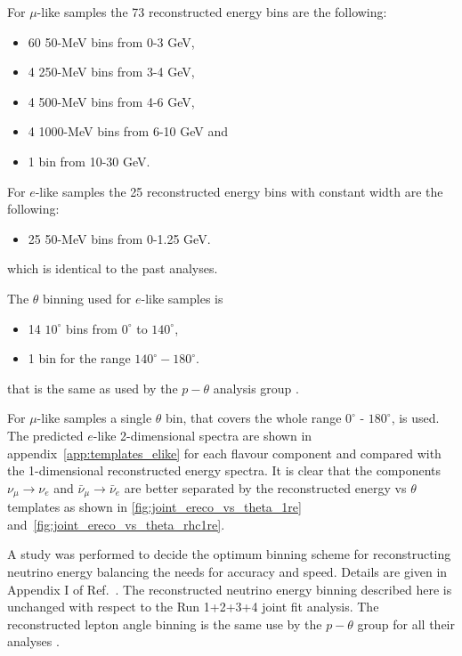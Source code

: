 For $\mu$-like samples the 73 reconstructed energy bins are the following:
\begin{itemize}
 \item   60 50-MeV bins from 0-3 GeV, 
 \item   4 250-MeV bins from 3-4 GeV, 
 \item   4 500-MeV bins from 4-6 GeV, 
 \item   4 1000-MeV bins from 6-10 GeV and
 \item   1 bin from 10-30 GeV.
\end{itemize}

For $e$-like samples the 25 reconstructed energy bins with constant width are the following:
\begin{itemize}
 \item   25 50-MeV bins from 0-1.25 GeV.
\end{itemize}
which is identical to the past analyses.

The $\theta$ binning used for $e$-like samples is
\begin{itemize}
 \item 14 $10^{\circ}$ bins from $0^{\circ}$ to $140^{\circ}$, 
 \item  1 bin for the range $140^{\circ} - 180^{\circ}$. 
\end{itemize}
that is the same as used by the $p-\theta$ analysis group \cite{ptheta}.

For $\mu$-like samples a single $\theta$ bin, that covers the whole range $0^{\circ}$ - $180^{\circ}$, is used.
The predicted $e$-like 2-dimensional spectra are shown in appendix~\ref{app:templates_elike} for each flavour component
and compared with the 1-dimensional reconstructed energy spectra.
It is clear that the components $\nu_{\mu} \rightarrow \nu_e$ 
and $\bar{\nu}_{\mu} \rightarrow \bar{\nu}_e$ are better separated by the 
reconstructed energy vs $\theta$ templates as shown in \cref{fig:joint_ereco_vs_theta_1re} and~\ref{fig:joint_ereco_vs_theta_rhc1re}.

A study was performed to decide the optimum binning scheme for reconstructing neutrino energy balancing the needs for accuracy and speed.
Details are given in Appendix I of Ref.\ \cite{OurRun123DisappAnalysis3Flavour}. 
The reconstructed neutrino energy binning described here is unchanged with respect to the Run 1+2+3+4 joint fit analysis.
The reconstructed lepton angle binning is the same use by the $p-\theta$ group for all their analyses \cite{ptheta}.

